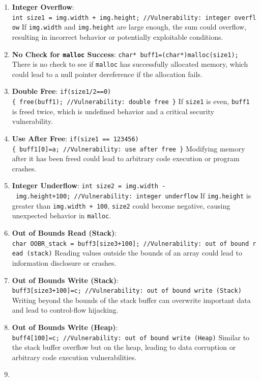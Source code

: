 \begin{adjustwidth}
\begin{tcolorbox}[breakable, colback=gray!10!white,colframe=gray!50!black,title=Wynik działania programu w formacie Markdown, left=2mm, right=2mm, top=1mm, bottom=1mm]
\begin{enumerate}
\def\labelenumi{\arabic{enumi}.}
\item
  \textbf{Integer Overflow}:
  \texttt{int\ size1\ =\ img.width\ +\ img.height;\ //Vulnerability:\ integer\ overflow}
  If \texttt{img.width} and \texttt{img.height} are large enough, the
  sum could overflow, resulting in incorrect behavior or potentially
  exploitable conditions.
\item
  \textbf{No Check for \texttt{malloc} Success}:
  \texttt{char*\ buff1=(char*)malloc(size1);} There is no check to see
  if \texttt{malloc} has successfully allocated memory, which could lead
  to a null pointer dereference if the allocation fails.
\item
  \textbf{Double Free}:
  \texttt{if(size1/2==0)\{\ free(buff1);\ //Vulnerability:\ double\ free\ \}}
  If \texttt{size1} is even, \texttt{buff1} is freed twice, which is
  undefined behavior and a critical security vulnerability.
\item
  \textbf{Use After Free}:
  \texttt{if(size1\ ==\ 123456)\{\ buff1{[}0{]}=\textquotesingle{}a\textquotesingle{};\ //Vulnerability:\ use\ after\ free\ \}}
  Modifying memory after it has been freed could lead to arbitrary code
  execution or program crashes.
\item
  \textbf{Integer Underflow}:
  \texttt{int\ size2\ =\ img.width\ -\ img.height+100;\ //Vulnerability:\ integer\ underflow}
  If \texttt{img.height} is greater than \texttt{img.width\ +\ 100},
  \texttt{size2} could become negative, causing unexpected behavior in
  \texttt{malloc}.
\item
  \textbf{Out of Bounds Read (Stack)}:
  \texttt{char\ OOBR\_stack\ =\ buff3{[}size3+100{]};\ //Vulnerability:\ out\ of\ bound\ read\ (stack)}
  Reading values outside the bounds of an array could lead to
  information disclosure or crashes.
\item
  \textbf{Out of Bounds Write (Stack)}:
  \texttt{buff3{[}size3+100{]}=\textquotesingle{}c\textquotesingle{};\ //Vulnerability:\ out\ of\ bound\ write\ (Stack)}
  Writing beyond the bounds of the stack buffer can overwrite important
  data and lead to control-flow hijacking.
\item
  \textbf{Out of Bounds Write (Heap)}:
  \texttt{buff4{[}100{]}=\textquotesingle{}c\textquotesingle{};\ //Vulnerability:\ out\ of\ bound\ write\ (Heap)}
  Similar to the stack buffer overflow but on the heap, leading to data
  corruption or arbitrary code execution vulnerabilities.
\item

\end{enumerate}
\end{tcolorbox}
\end{adjustwidth}
